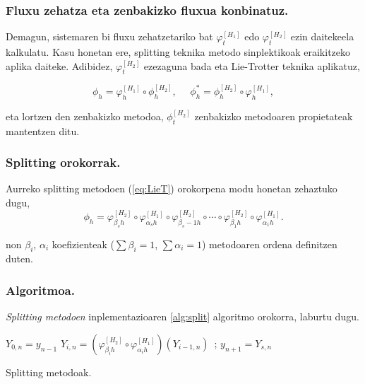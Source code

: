 \subsubsection*{Fluxu zehatza eta zenbakizko fluxua konbinatuz.}
Demagun, sistemaren bi fluxu zehatzetariko bat $\varphi_t^{[H_1]}$ edo $\varphi_t^{[H_2]}$ ezin daitekeela kalkulatu. Kasu honetan ere, splitting teknika  metodo sinplektikoak eraikitzeko aplika daiteke. Adibidez, $\varphi_t^{[H_2]}$ ezezaguna bada eta Lie-Trotter teknika aplikatuz,

\begin{equation*}
\phi_h=\varphi_h^{[H_1]} \circ \phi_h^{[H_2]}, \ \ \ \ \ \  \phi_h^{*}=\phi_h^{[H_2]} \circ \varphi_h^{[H_1]},
\end{equation*}

eta lortzen den zenbakizko metodoa, $\phi_t^{[H_2]}$ zenbakizko metodoaren propietateak mantentzen ditu. 

\subsubsection*{Splitting orokorrak.}

Aurreko splitting metodoen (\ref{eq:LieT}) orokorpena modu honetan zehaztuko dugu,
\begin{equation}
\phi_h = \varphi_{\beta_s h}^{[H_2]} \circ \varphi_{\alpha_s h}^{[H_1]} \circ \varphi_{\beta_s-1 h}^{[H_2]} 
\circ \cdots \circ \varphi_{\beta_1 h}^{[H_2]} \circ \varphi_{\alpha_1 h}^{[H_1]} .
\end{equation}

non $\beta_i$, $\alpha_i$ koefizienteak ($\sum \beta_i=1$, $\sum \alpha_i=1$) metodoaren ordena definitzen duten.


\subsubsection*{Algoritmoa.}

\emph{Splitting metodoen} inplementazioaren \ref{alg:split} algoritmo orokorra, laburtu dugu.

\begin{algorithm}[H]
 \BlankLine
  {
   \BlankLine
    $Y_{0,n}=y_{n-1} $\;
    \BlankLine
   {
    \BlankLine 
    $Y_{i,n}=(\varphi^{[H_2]}_{\beta_i h} \circ \varphi^{[H_1]}_{\alpha_i h})(Y_{i-1,n})$\ ;
   }
   \BlankLine
    $y_{n+1}=Y_{s,n}$\;
   \BlankLine
 }
 \caption{Splitting metodoak.}
 \label{alg:split}
\end{algorithm}

